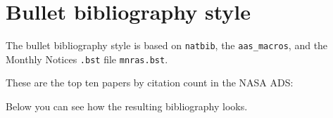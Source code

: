 \documentclass{article}
\begin{document}
\section*{Bullet bibliography style}

The bullet bibliography style is based on 
{\tt natbib}, 
the {\tt aas\_macros}, 
and the Monthly Notices {\tt .bst} file {\tt mnras.bst}.

These are the top ten papers by citation count in the NASA ADS: \citet{1973A&A....24..337S,1998ApJ...500..525S,1998AJ....116.1009R,2016A&A...594A..13P,2020A&A...641A...6P,1999ApJ...517..565P,1981PhRvB..23.5048P,2005Natur.438..197N,2013A&A...558A..33A,2016PhRvL.116f1102A}

Below you can see how the resulting bibliography looks.



\end{document}

